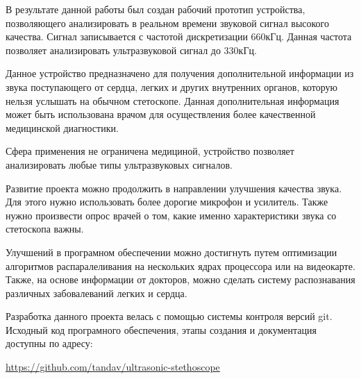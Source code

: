 \documentclass[../paper.tex]{subfiles}
\begin{document}
В результате данной работы был создан рабочий прототип устройства, позволяющего анализировать в реальном времени звуковой сигнал высокого качества. Сигнал записывается с частотой дискретизации 660кГц. Данная частота позволяет анализировать ультразвуковой сигнал до 330кГц.

Данное устройство предназначено для получения дополнительной информации из звука поступающего от сердца, легких и других внутренних органов, которую нельзя услышать на обычном стетоскопе. Данная дополнительная информация может быть использована врачом для осуществления более качественной медицинской диагностики.

Сфера применения не ограничена медициной, устройство позволяет анализировать любые типы ультразвуковых сигналов.

Развитие проекта можно продолжить в направлении улучшения качества звука. Для этого нужно использовать более дорогие микрофон и усилитель. Также нужно произвести опрос врачей о том, какие именно характеристики звука со стетоскопа важны.

Улучшений в програмном обеспечении можно достигнуть путем оптимизации алгоритмов распаралеливания на нескольких ядрах процессора или на видеокарте. Также, на основе информации от докторов, можно сделать систему распознавания различных забовалеваний легких и сердца.

Разработка данного проекта велась с помощью системы контроля версий git. Исходный код програмного обеспечения, этапы создания и документация доступны по адресу:

\url{https://github.com/tandav/ultrasonic-stethoscope}
\end{document}
